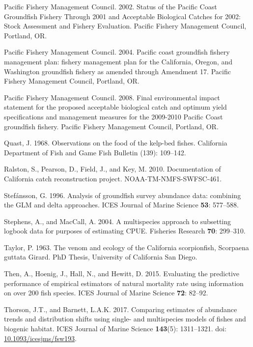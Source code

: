 \documentclass[12pt,]{article}
\begin{document}
\hypertarget{ref-PFMC2002}{}
Pacific Fishery Management Council. 2002. Status of the Pacific Coast
Groundfish Fishery Through 2001 and Acceptable Biological Catches for
2002: Stock Assessment and Fishery Evaluation. Pacific Fishery
Management Council, Portland, OR.

\hypertarget{ref-PFMC2004}{}
Pacific Fishery Management Council. 2004. Pacific coast groundfish
fishery management plan: fishery management plan for the California,
Oregon, and Washington groundfish fishery as amended through Amendment
17. Pacific Fishery Management Council, Portland, OR.

\hypertarget{ref-PFMC2008}{}
Pacific Fishery Management Council. 2008. Final environmental impact
statement for the proposed acceptable biological catch and optimum yield
specifications and management measures for the 2009-2010 Pacific Coast
groundfish fishery. Pacific Fishery Management Council, Portland, OR.

\hypertarget{ref-Quast1968}{}
Quast, J. 1968. Observations on the food of the kelp-bed fishes.
California Department of Fish and Game Fish Bulletin (139): 109--142.

\hypertarget{ref-Ralston2010}{}
Ralston, S., Pearson, D., Field, J., and Key, M. 2010. Documentation of
California catch reconstruction project. NOAA-TM-NMFS-SWFSC-461.

\hypertarget{ref-Stefansson1996}{}
Stefánsson, G. 1996. Analysis of groundfish survey abundance data:
combining the GLM and delta approaches. ICES Journal of Marine Science
\textbf{53}: 577--588.

\hypertarget{ref-Stephens2004}{}
Stephens, A., and MacCall, A. 2004. A multispecies approach to
subsetting logbook data for purposes of estimating CPUE. Fisheries
Research \textbf{70}: 299--310.

\hypertarget{ref-Taylor1963}{}
Taylor, P. 1963. The venom and ecology of the California scorpionfish,
Scorpaena guttata Girard. PhD Thesis, University of California San
Diego.

\hypertarget{ref-Then2015}{}
Then, A., Hoenig, J., Hall, N., and Hewitt, D. 2015. Evaluating the
predictive performance of empirical estimators of natural mortality rate
using information on over 200 fish species. ICES Journal of Marine
Science \textbf{72}: 82--92.

\hypertarget{ref-Thorson2017}{}
Thorson, J.T., and Barnett, L.A.K. 2017. Comparing estimates of
abundance trends and distribution shifts using single- and multispecies
models of fishes and biogenic habitat. ICES Journal of Marine Science
\textbf{143}(5): 1311--1321. doi:
\href{https://doi.org/10.1093/icesjms/fsw193}{10.1093/icesjms/fsw193}.
\end{document}
